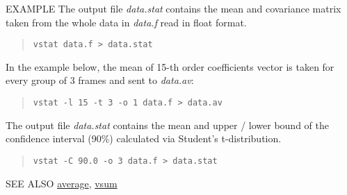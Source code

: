 \begin{qsection}{EXAMPLE}
The output file {\em data.stat} contains the mean and covariance matrix
taken from the whole data in {\em data.f} read in float format.
\begin{quote}
  \verb!vstat data.f > data.stat!
\end{quote}

In the example below, the mean of 15-th order coefficients vector is taken
for every group of 3 frames and sent to {\em data.av}:
\begin{quote}
  \verb!vstat -l 15 -t 3 -o 1 data.f > data.av!
\end{quote}

The output file {\em data.stat} contains the mean and upper / lower
bound of the confidence interval (90\%) calculated via Student's t-distribution.
\begin{quote}
  \verb!vstat -C 90.0 -o 3 data.f > data.stat!
\end{quote}
\end{qsection}

\begin{qsection}{SEE ALSO}
\hyperlink{average}{average},
\hyperlink{vsum}{vsum}
\end{qsection}
